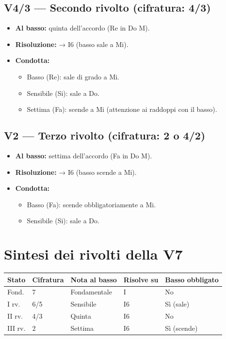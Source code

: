 \subsection{V4/3 — Secondo rivolto (cifratura: 4/3)}
\begin{itemize}
    \item \textbf{Al basso:} quinta dell'accordo (Re in Do M).
    \item \textbf{Risoluzione:} → I6 (basso sale a Mi).
    \item \textbf{Condotta:} 
    \begin{itemize}
        \item Basso (Re): sale di grado a Mi.
        \item Sensibile (Si): sale a Do.
        \item Settima (Fa): scende a Mi (attenzione ai raddoppi con il basso).
    \end{itemize}
\end{itemize}

\subsection{V2 — Terzo rivolto (cifratura: 2 o 4/2)}
\begin{itemize}
    \item \textbf{Al basso:} settima dell'accordo (Fa in Do M).
    \item \textbf{Risoluzione:} → I6 (basso scende a Mi).
    \item \textbf{Condotta:} 
    \begin{itemize}
        \item Basso (Fa): scende obbligatoriamente a Mi.
        \item Sensibile (Si): sale a Do.
    \end{itemize}
\end{itemize}

\section{Sintesi dei rivolti della V7}
\label{sec:sintesi_rivolti_v7}

\begin{center}
\begin{tabular}{|l|l|l|l|l|}
\hline
Stato & Cifratura & Nota al basso & Risolve su & Basso obbligato \\
\hline
Fond. & 7 & Fondamentale & I & No \\
I rv. & 6/5 & Sensibile & I6 & Sì (sale) \\
II rv. & 4/3 & Quinta & I6 & No \\
III rv. & 2 & Settima & I6 & Sì (scende) \\
\hline
\end{tabular}
\end{center}

